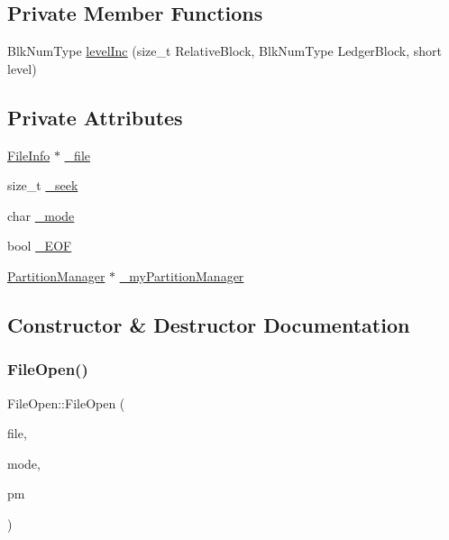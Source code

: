 \subsection*{Private Member Functions}
\begin{DoxyCompactItemize}
\item 
Blk\+Num\+Type \mbox{\hyperlink{class_file_open_a74e35be92bea88b55c4bd27210fc1e93}{level\+Inc}} (size\+\_\+t Relative\+Block, Blk\+Num\+Type Ledger\+Block, short level)
\end{DoxyCompactItemize}
\subsection*{Private Attributes}
\begin{DoxyCompactItemize}
\item 
\mbox{\hyperlink{class_file_info}{File\+Info}} $\ast$ \mbox{\hyperlink{class_file_open_a78417882067d6b7165c2c555415f916e}{\+\_\+file}}
\item 
size\+\_\+t \mbox{\hyperlink{class_file_open_ab86e9cd9610259823502b95ef24b1f09}{\+\_\+seek}}
\item 
char \mbox{\hyperlink{class_file_open_a7f676d4b9b4792d73a950ef5e7ed405b}{\+\_\+mode}}
\item 
bool \mbox{\hyperlink{class_file_open_a33c7c6772339bcb6533818342d415cd6}{\+\_\+\+E\+OF}}
\item 
\mbox{\hyperlink{class_partition_manager}{Partition\+Manager}} $\ast$ \mbox{\hyperlink{class_file_open_aa0396ecb3d4f17a4c068fea198712666}{\+\_\+my\+Partition\+Manager}}
\end{DoxyCompactItemize}


\subsection{Constructor \& Destructor Documentation}
\mbox{\label{class_file_open_a387c8980a812856a3633ff162c1c1af4}} 
\subsubsection{\texorpdfstring{File\+Open()}{FileOpen()}}
{\footnotesize\ttfamily File\+Open\+::\+File\+Open (\begin{DoxyParamCaption}\item[{\mbox{\hyperlink{class_file_info}{File\+Info}} $\ast$}]{file,  }\item[{char}]{mode,  }\item[{\mbox{\hyperlink{class_partition_manager}{Partition\+Manager}} $\ast$}]{pm }\end{DoxyParamCaption})}



